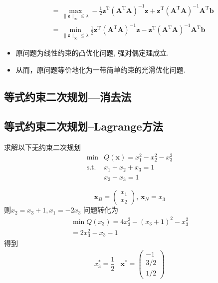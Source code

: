 \begin{example}
\begin{solution}
\[\begin{aligned}
                &=\max_{\|\boldsymbol{z}\|_\infty\leqslant\lambda}-\frac12\boldsymbol{z}^{\mathrm{T}}(\boldsymbol{A}^{\mathrm{T}}\boldsymbol{A})^{-1}\boldsymbol{z}+\boldsymbol{z}^{\mathrm{T}}(\boldsymbol{A}^{\mathrm{T}}\boldsymbol{A})^{-1}\boldsymbol{A}^{\mathrm{T}}\boldsymbol{b}\\
                &=\min_{\|\boldsymbol{z}\|_\infty\leqslant\lambda}\frac12\boldsymbol{z}^{\mathrm{T}}(\boldsymbol{A}^{\mathrm{T}}\boldsymbol{A})^{-1}\boldsymbol{z}-\boldsymbol{z}^{\mathrm{T}}(\boldsymbol{A}^{\mathrm{T}}\boldsymbol{A})^{-1}\boldsymbol{A}^{\mathrm{T}}\boldsymbol{b}
            \end{aligned}
        \]
        \begin{itemize}
            \item 原问题为线性约束的凸优化问题, 强对偶定理成立.
            \item 从而，原问题等价地化为一带简单约束的光滑优化问题.
        \end{itemize}
    \end{solution}
\end{example}
\subsection{等式约束二次规划—消去法}
\subsection{等式约束二次规划--Lagrange方法}
\begin{example}
    求解以下\colorbox{cyan!50}{无约束二次规划}
    \[
        \begin{array}{rl}
            \min & Q (\boldsymbol{x}) = x_1^2-x_2^2-x_3^2\\
            \operatorname{s.t.} & x_1+x_2+x_3 = 1\\
            & x_2-x_3 = 1
        \end{array}
    \]
    \begin{solution}
        \[
            \boldsymbol{x}_B = \begin{pmatrix}
                x_1\\x_2
            \end{pmatrix},\, \boldsymbol{x}_N = x_3
        \]
        则$x_2 = x_3+1,x_1 = -2x_3$
        问题转化为
        \[
            \begin{array}{l}
                \min Q(x_3) = 4x_3^2-(x_3+1)^2-x_3^2\\
                =2x_3^2-x_3-1
            \end{array}
        \]
        得到
        \[
            \begin{array}{cc}
                x_3^* = \dfrac{1}{2} &
                \boldsymbol{x}^* = \begin{pmatrix}
                    -1\\ 3/2\\ 1/2
                \end{pmatrix}
            \end{array}
        \]
    \end{solution}
\end{example}

